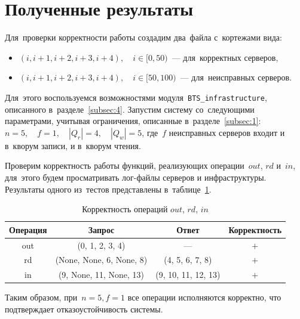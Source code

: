 \section{Полученные результаты}\label{sec:3}
Для~проверки корректности работы создадим два~файла с~кортежами вида:
\begin{itemize}
	\item $(i, i + 1, i + 2, i + 3, i + 4), \quad i \in [0, 50)$~--- для~корректных серверов,
	\item $(i, i + 1, i + 2, i + 3, i + 4), \quad i \in [50, 100)$~--- для~неисправных серверов.
\end{itemize}
Для~этого воспользуемся возможностями модуля~\texttt{BTS_infrastructure}, описанного в~разделе~\ref{subsec:4}. Запустим систему со~следующими параметрами, учитывая ограничения, описанные в~разделе~\ref{subsec:1}: $n = 5, \quad f = 1, \quad |Q_r| = 4, \quad |Q_w| = 5$, где~$f$ неисправных серверов входит и в~кворум записи, и в~кворум чтения.

Проверим корректность работы функций, реализующих операции~$out$, $rd$ и~$in$, для~этого будем просматривать лог-файлы серверов и инфраструктуры. Результаты одного из~тестов представлены в~таблице~\ref{tab:1}.
\begin{table}[H]
\centering
\caption{Корректность операций $out$, $rd$, $in$}\label{tab:1}
\begin{tabular}{cccc}
	\toprule
	Операция &     Запрос     & Ответ & Корректность \\
	\midrule
	out      & (0, 1, 2, 3, 4)  &       ---       & $ + $ \\
	rd       & (None, None, 6, None, 8)  & (4, 5, 6, 7, 8) & $ + $ \\
	in       & (9, None, 11, None, 13)  & (9, 10, 11, 12, 13) & $ + $ \\
	\bottomrule
\end{tabular}
\end{table}
Таким образом, при~$n = 5, f = 1$ все операции исполняются корректно, что подтверждает отказоустойчивость системы.

